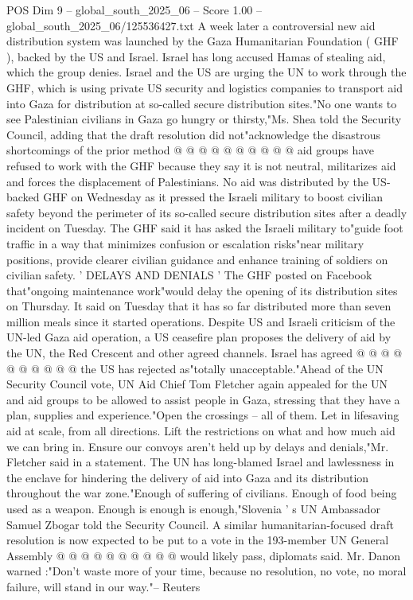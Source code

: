 \begin{textsample}{POS Dim 9 – global\_south\_2025\_06 – Score 1.00 – global\_south\_2025\_06/125536427.txt}
A week later a controversial new aid distribution system was launched by the Gaza Humanitarian Foundation ( GHF ), backed by the US and Israel.
Israel has long accused Hamas of stealing aid, which the group denies.
Israel and the US are urging the UN to work through the GHF, which is using private US security and logistics companies to transport aid into Gaza for distribution at so-called secure distribution sites."No one wants to see Palestinian civilians in Gaza go hungry or thirsty,"Ms.
Shea told the Security Council, adding that the draft resolution did not"acknowledge the disastrous shortcomings of the prior method @ @ @ @ @ @ @ @ @ @ aid groups have refused to work with the GHF because they say it is not neutral, militarizes aid and forces the displacement of Palestinians.
No aid was distributed by the US-backed GHF on Wednesday as it pressed the Israeli military to boost civilian safety beyond the perimeter of its so-called secure distribution sites after a deadly incident on Tuesday.
The GHF said it has asked the Israeli military to"guide foot traffic in a way that minimizes confusion or escalation risks"near military positions, provide clearer civilian guidance and enhance training of soldiers on civilian safety. ' DELAYS AND DENIALS ' The GHF posted on Facebook that"ongoing maintenance work"would delay the opening of its distribution sites on Thursday.
It said on Tuesday that it has so far distributed more than seven million meals since it started operations.
Despite US and Israeli criticism of the UN-led Gaza aid operation, a US ceasefire plan proposes the delivery of aid by the UN, the Red Crescent and other agreed channels.
Israel has agreed @ @ @ @ @ @ @ @ @ @ the US has rejected as"totally unacceptable."Ahead of the UN Security Council vote, UN Aid Chief Tom Fletcher again appealed for the UN and aid groups to be allowed to assist people in Gaza, stressing that they have a plan, supplies and experience."Open the crossings -- all of them.
Let in lifesaving aid at scale, from all directions.
Lift the restrictions on what and how much aid we can bring in.
Ensure our convoys aren't held up by delays and denials,"Mr.
Fletcher said in a statement.
The UN has long-blamed Israel and lawlessness in the enclave for hindering the delivery of aid into Gaza and its distribution throughout the war zone."Enough of suffering of civilians.
Enough of food being used as a weapon.
Enough is enough is enough,"Slovenia ' s UN Ambassador Samuel Zbogar told the Security Council.
A similar humanitarian-focused draft resolution is now expected to be put to a vote in the 193-member UN General Assembly @ @ @ @ @ @ @ @ @ @ would likely pass, diplomats said.
Mr.
Danon warned :"Don't waste more of your time, because no resolution, no vote, no moral failure, will stand in our way."-- Reuters

\end{textsample}

